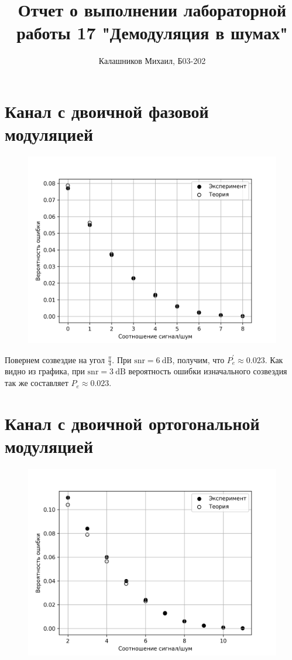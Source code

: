 \documentclass[14pt, a4paper]{article}
\title{\textbf{Отчет о выполнении лабораторной работы 17 "Демодуляция в шумах"}}
\author{Калашников Михаил, Б03-202}
\date{}
\begin{document}
\maketitle

\section{Канал с двоичной фазовой модуляцией}

\begin{figure}[H]
\centering
\includegraphics[width=.6\linewidth]{../images/rt2-1}
\end{figure}

Повернем созвездие на угол $\frac{\pi}{4}$. При $\text{snr}=6\ \text{dB}$, получим, что $P_e^\prime\approx0.023$. Как видно из графика, при $\text{snr}=3\ \text{dB}$ вероятность ошибки изначального созвездия так же составляет $P_e\approx0.023$.

\section{Канал с двоичной ортогональной модуляцией}

\begin{figure}[H]
\centering
\includegraphics[width=.6\linewidth]{../images/rt2-2}
\end{figure}
\end{document}
